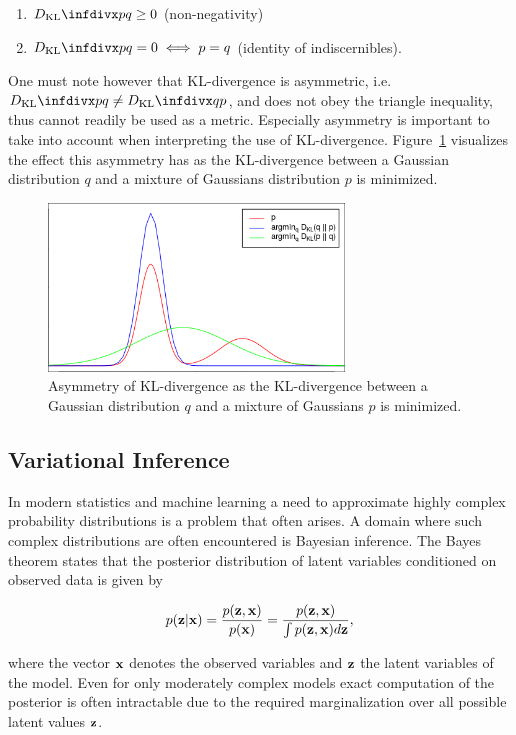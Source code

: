 \begin{enumerate}
\item $\dkl{p}{q} \geq 0$ (non-negativity)
\item $\dkl{p}{q} = 0 \iff p = q$ (identity of indiscernibles).
\end{enumerate}

One must note however that KL-divergence is asymmetric, i.e. $\dkl{p}{q} \neq \dkl{q}{p}$, and does not obey the triangle inequality, thus cannot readily be used as a metric. Especially asymmetry is important to take into account when interpreting the use of KL-divergence. Figure~\ref{fig:kl_divergence} visualizes the effect this asymmetry has as the KL-divergence between a Gaussian distribution $q$ and a mixture of Gaussians distribution $p$ is minimized.

\begin{figure}[!htb]
  \centering
  \includegraphics[width=0.7\textwidth]{images/kl_divergence.png}
  \caption{Asymmetry of KL-divergence as the KL-divergence between a Gaussian distribution $q$ and a mixture of Gaussians $p$ is minimized.}
  \label{fig:kl_divergence}
\end{figure}

\subsection{Variational Inference}
\label{subsection:variational_inference}

In modern statistics and machine learning a need to approximate highly complex probability distributions is a problem that often arises. A domain where such complex distributions are often encountered is Bayesian inference. The Bayes theorem states that the posterior distribution of latent variables conditioned on observed data is given by

$$p(\mathbf{z} \vert \mathbf{x}) = \frac{p(\mathbf{z}, \mathbf{x})}{p(\mathbf{x})} = \frac{p(\mathbf{z}, \mathbf{x})}{\int p(\mathbf{z}, \mathbf{x}) d\mathbf{z}},$$

where the vector $\mathbf{x}$ denotes the observed variables and $\mathbf{z}$ the latent variables of the model. Even for only moderately complex models exact computation of the posterior is often intractable due to the required marginalization over all possible latent values $\mathbf{z}$.

